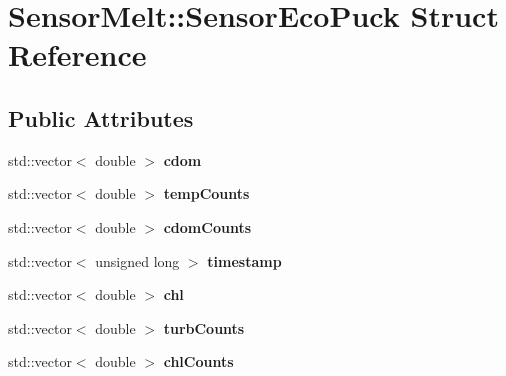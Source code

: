 \hypertarget{structSensorMelt_1_1SensorEcoPuck}{}\section{Sensor\+Melt\+:\+:Sensor\+Eco\+Puck Struct Reference}
\label{structSensorMelt_1_1SensorEcoPuck}
\subsection*{Public Attributes}
\begin{DoxyCompactItemize}
\item 
std\+::vector$<$ double $>$ {\bfseries cdom}\hypertarget{structSensorMelt_1_1SensorEcoPuck_a669b9bfc0a3f2c84b208f036304d5f32}{}\label{structSensorMelt_1_1SensorEcoPuck_a669b9bfc0a3f2c84b208f036304d5f32}

\item 
std\+::vector$<$ double $>$ {\bfseries temp\+Counts}\hypertarget{structSensorMelt_1_1SensorEcoPuck_a086186827e06753f4f03aa58553fc125}{}\label{structSensorMelt_1_1SensorEcoPuck_a086186827e06753f4f03aa58553fc125}

\item 
std\+::vector$<$ double $>$ {\bfseries cdom\+Counts}\hypertarget{structSensorMelt_1_1SensorEcoPuck_a46ca4e2299e45530bef1b2894979d75a}{}\label{structSensorMelt_1_1SensorEcoPuck_a46ca4e2299e45530bef1b2894979d75a}

\item 
std\+::vector$<$ unsigned long $>$ {\bfseries timestamp}\hypertarget{structSensorMelt_1_1SensorEcoPuck_a469809b2287f2753eed4b2db53368e18}{}\label{structSensorMelt_1_1SensorEcoPuck_a469809b2287f2753eed4b2db53368e18}

\item 
std\+::vector$<$ double $>$ {\bfseries chl}\hypertarget{structSensorMelt_1_1SensorEcoPuck_a4e68310de0031351ebfb82e4ec84ac17}{}\label{structSensorMelt_1_1SensorEcoPuck_a4e68310de0031351ebfb82e4ec84ac17}

\item 
std\+::vector$<$ double $>$ {\bfseries turb\+Counts}\hypertarget{structSensorMelt_1_1SensorEcoPuck_a3ad9486b4133a7a98d86da75e94b4583}{}\label{structSensorMelt_1_1SensorEcoPuck_a3ad9486b4133a7a98d86da75e94b4583}

\item 
std\+::vector$<$ double $>$ {\bfseries chl\+Counts}\hypertarget{structSensorMelt_1_1SensorEcoPuck_a9263a93b592130d1906a3e1daa734bd1}{}\label{structSensorMelt_1_1SensorEcoPuck_a9263a93b592130d1906a3e1daa734bd1}


\end{DoxyCompactItemize}
